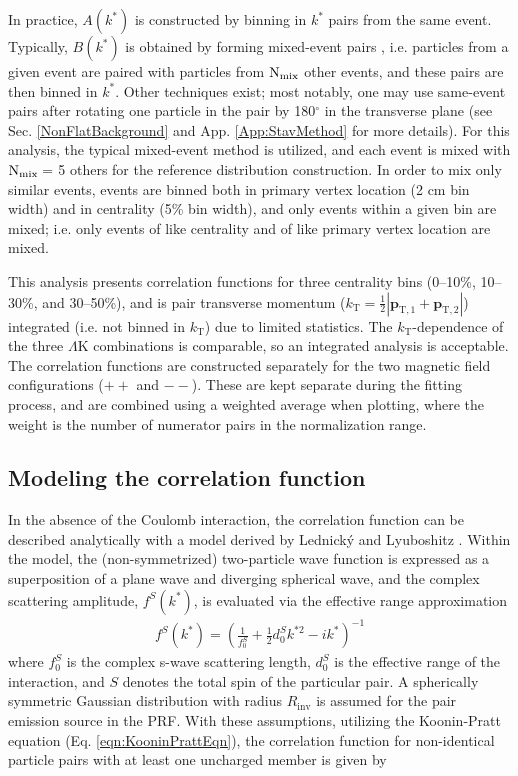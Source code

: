 \documentclass[ALICE,manyauthors]{cernphprep}
\newcommand{\kstar}{$k^{*}$\xspace}
\newcommand{\LamK}{$\Lambda$K\xspace}
\begin{document}
In practice, $A(k^{*})$ is constructed by binning in \kstar pairs from the same event.
Typically, $B(k^{*})$ is obtained by forming mixed-event pairs \cite{Kopylov:1974th}, i.e. particles from a given event are paired with particles from $\rm N_{mix}$ other events, and these pairs are then binned in \kstar.
Other techniques exist; most notably, one may use same-event pairs after rotating one particle in the pair by 180$^\circ$ in the transverse plane (see Sec. \ref{NonFlatBackground} and App. \ref{App:StavMethod} for more details).
For this analysis, the typical mixed-event method is utilized, and each event is mixed with $\rm N_{mix} =$ 5 others for the reference distribution construction.
In order to mix only similar events, events are binned both in primary vertex location (2 cm bin width) and in centrality (5\% bin width), and only events within a given bin are mixed; i.e. only events of like centrality and of like primary vertex location are mixed.

This analysis presents correlation functions for three centrality bins (0--10\%, 10--30\%, and 30--50\%), and is pair transverse momentum ($k_{\mathrm{T}} = \frac{1}{2}|\mathbf{p}_{\mathrm{T,1}}+\mathbf{p}_{\mathrm{T,2}}|$) integrated (i.e. not binned in $k_{\mathrm{T}}$) due to limited statistics.
The $k_{\mathrm{T}}$-dependence of the three \LamK combinations is comparable, so an integrated analysis is acceptable.
The correlation functions are constructed separately for the two magnetic field configurations ($++$ and $--$).
These are kept separate during the fitting process, and are combined using a weighted average when plotting, where the weight is the number of numerator pairs in the normalization range.

\subsection{Modeling the correlation function}
\label{sec:ModelingCF}


In the absence of the Coulomb interaction, the correlation function can be described analytically with a model derived by Lednick\'y and Lyuboshitz \cite{Lednicky:82}.
Within the model, the (non-symmetrized) two-particle wave function is expressed as a superposition of a plane wave and diverging spherical wave, and the complex scattering amplitude, $f^{S}(k^{*})$, is evaluated via the effective range approximation
\begin{equation}
\begin{aligned}
f^{S}(k^{*}) = \left( \frac{1}{f^{S}_{0}} + \frac{1}{2}d^{S}_{0}k^{*2} - ik^{*} \right)^{-1}
\end{aligned}
\label{eqn:ScatteringParam}
\end{equation}
where $f^{S}_{0}$ is the complex s-wave scattering length, $d^{S}_{0}$ is the effective range of the interaction, and $S$ denotes the total spin of the particular pair.
A spherically symmetric Gaussian distribution with radius $R_{\mathrm{inv}}$  is assumed for the pair emission source in the PRF.
With these assumptions, utilizing the Koonin-Pratt equation (Eq. \ref{eqn:KooninPrattEqn}), the correlation function for non-identical particle pairs with at least one uncharged member is given by \cite{Lednicky:82}
\end{document}
